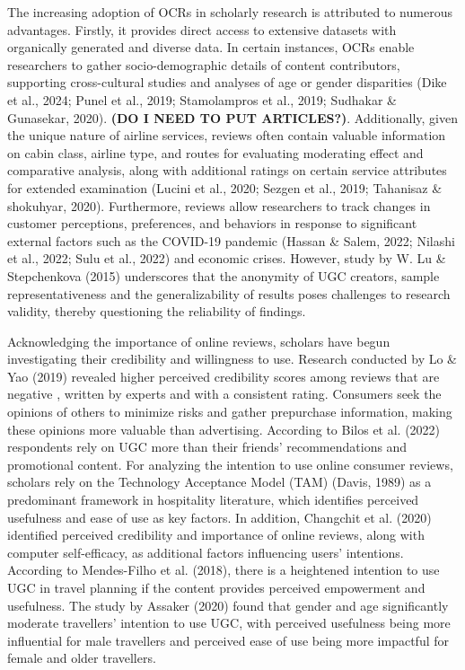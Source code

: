 \documentclass[
]{agujournal2019}
\begin{document}
The increasing adoption of OCRs in scholarly research is attributed to
numerous advantages. Firstly, it provides direct access to extensive
datasets with organically generated and diverse data. In certain
instances, OCRs enable researchers to gather socio-demographic details
of content contributors, supporting cross-cultural studies and analyses
of age or gender disparities (Dike et al., 2024; Punel et al., 2019;
Stamolampros et al., 2019; Sudhakar \& Gunasekar, 2020). \textbf{(DO I
NEED TO PUT ARTICLES?)}. Additionally, given the unique nature of
airline services, reviews often contain valuable information on cabin
class, airline type, and routes for evaluating moderating effect and
comparative analysis, along with additional ratings on certain service
attributes for extended examination (Lucini et al., 2020; Sezgen et al.,
2019; Tahanisaz \& shokuhyar, 2020). Furthermore, reviews allow
researchers to track changes in customer perceptions, preferences, and
behaviors in response to significant external factors such as the
COVID-19 pandemic (Hassan \& Salem, 2022; Nilashi et al., 2022; Sulu et
al., 2022) and economic crises. However, study by W. Lu \& Stepchenkova
(2015) underscores that the anonymity of UGC creators, sample
representativeness and the generalizability of results poses challenges
to research validity, thereby questioning the reliability of findings.

Acknowledging the importance of online reviews, scholars have begun
investigating their credibility and willingness to use. Research
conducted by Lo \& Yao (2019) revealed higher perceived credibility
scores among reviews that are negative , written by experts and with a
consistent rating. Consumers seek the opinions of others to minimize
risks and gather prepurchase information, making these opinions more
valuable than advertising. According to Bilos et al. (2022) respondents
rely on UGC more than their friends' recommendations and promotional
content. For analyzing the intention to use online consumer reviews,
scholars rely on the Technology Acceptance Model (TAM) (Davis, 1989) as
a predominant framework in hospitality literature, which identifies
perceived usefulness and ease of use as key factors. In addition,
Changchit et al. (2020) identified perceived credibility and importance
of online reviews, along with computer self-efficacy, as additional
factors influencing users' intentions. According to Mendes-Filho et al.
(2018), there is a heightened intention to use UGC in travel planning if
the content provides perceived empowerment and usefulness. The study by
Assaker (2020) found that gender and age significantly moderate
travellers' intention to use UGC, with perceived usefulness being more
influential for male travellers and perceived ease of use being more
impactful for female and older travellers.
\end{document}
